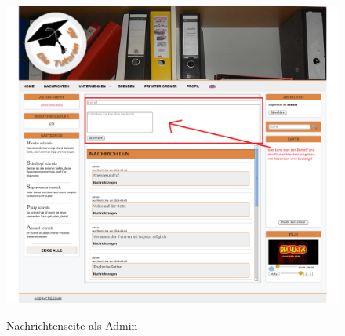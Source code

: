 \begin{figure}[!htbp]
 \centering
 \includegraphics[width=1\textwidth]{../Screenshots/de/Nachrichten_admin}
 \label{fig:Nachrichten_admin}
 \caption{Nachrichtenseite als Admin}
\end{figure}
